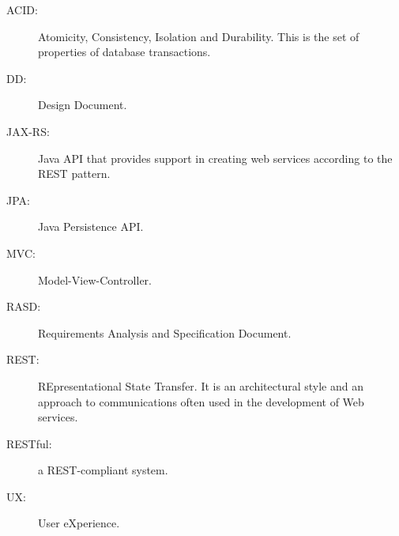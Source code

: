 \begin{description}
\item[ACID:] Atomicity, Consistency, Isolation and Durability. This is the set of properties of database transactions. 
\item[DD:] Design Document.
\item[JAX-RS:] Java API that provides support in creating web services according to the REST pattern.
\item[JPA:] Java Persistence API.
\item[MVC:] Model-View-Controller.
\item[RASD:] Requirements Analysis and Specification Document.
\item[REST:] REpresentational State Transfer. It is an architectural style and an approach to communications often used in the development of Web services.
\item[RESTful:] a REST-compliant system.
\item[UX:] User eXperience.
\end{description}
